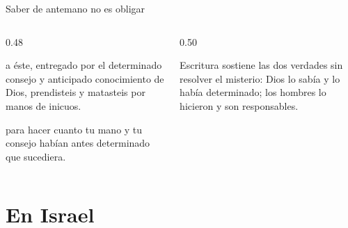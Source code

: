 \begin{frame}{Saber de antemano no es obligar}
\begin{columns}[c,onlytextwidth]
\begin{column}{0.48\textwidth}
\begin{cita}a éste, entregado por el determinado consejo y anticipado conocimiento de Dios, prendisteis y matasteis por manos de inicuos.\end{cita}
\begin{cita}para hacer cuanto tu mano y tu consejo habían antes determinado que sucediera.\end{cita}
\end{column}
\begin{column}{0.50\textwidth}
\centering
{}\par\smallskip
\scriptsize Escritura sostiene las dos verdades sin resolver el misterio: Dios lo sabía y lo había determinado; los hombres lo hicieron y son responsables.
\end{column}
\end{columns}
\end{frame}

\section{En Israel}

